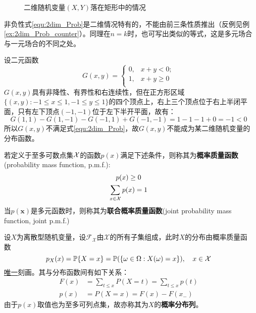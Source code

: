 \begin{figure}[htbp]
    \centering
    \caption{二维随机变量$(X,Y)$落在矩形中的情况}\label{fig:3.1.2}
\end{figure}

非负性式\ref{equ:2dim_Prob}是二维情况特有的，不能由前三条性质推出（反例见例\ref{ex:2dim_Prob_counter}）。同理在$n=k$时，也可写出类似的等式，这是多元场合与一元场合的不同之处。

\begin{example}\label{ex:2dim_Prob_counter}
    设二元函数
    \[ G(x,y)=\begin{cases}
            0, & x+y < 0;  \\
            1, & x+y \ge 0 \\
        \end{cases}	\]
    $G(x,y)$具有非降性、有界性和右连续性，但在正方形区域$\{(x,y): -1\le x\le 1,-1\le y\le 1\}$的四个顶点上，右上三个顶点位于右上半闭平面，只有左下顶点$(-1,-1)$位于左下半开平面，故有：
    \[ G(1,1)-G(1,-1)-G(-1,1)+G(-1,-1)=1-1-1+0=-1<0 \]
    所以$G(x,y)$不满足式\ref{equ:2dim_Prob}，故$G(x,y)$不能成为某二维随机变量的分布函数。
\end{example}

\begin{definition}[概率质量函数]
    若定义于至多可数点集$\X$的函数$p(x)$满足下述条件，则称其为\textbf{概率质量函数}(probability mass function, p.m.f.):
    \begin{gather*}
        p(x) \ge 0\\
        \sum_{x \in \X}p(x) = 1
    \end{gather*}
    当$p(\mathbf{x})$是多元函数时，则称其为\textbf{联合概率质量函数}(joint probability mass function, joint p.m.f.)
\end{definition}

设$X$为离散型随机变量，设$\mathscr{F}_{\mathcal{X}}$由$\mathcal{X}$的所有子集组成，此时$X$的分布由概率质量函数
\[ p_{X}(x) = \P\{X=x\} = \P(\{\omega\in\Omega:X(\omega)=x\}), \quad x\in\mathcal{X} \]
\underline{唯一}刻画。其与分布函数间有如下关系：
\begin{align*}
    F(x) & = \sum_{t\le x}P(X=t)=\sum_{t\le x}p(t) \\
    p(x) & = P(X=x)=F(x)-F(x_-)
\end{align*}
由于$p(x)$取值也为至多可列点集，故亦称其为$X$的\textbf{概率分布列}。

